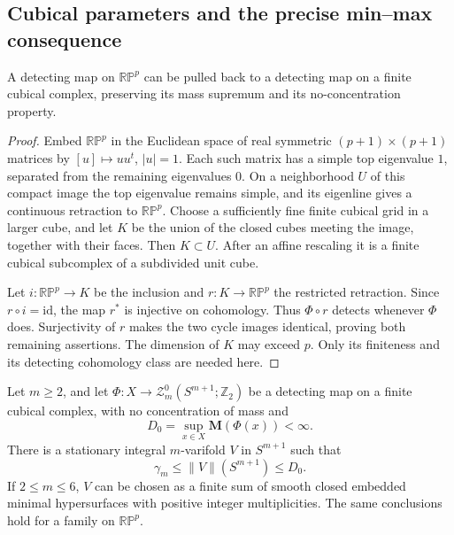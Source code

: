 \subsection{Cubical parameters and the precise min--max consequence}

\begin{lemma}\label{lem:minmax-cubical}
A detecting map on $\mathbb{RP}^{p}$ can be pulled back to a
detecting map on a finite cubical complex, preserving its mass
supremum and its no-concentration property.
\end{lemma}

\begin{proof}
Embed $\mathbb{RP}^{p}$ in the Euclidean space of real symmetric
$(p+1)\times(p+1)$ matrices by $[u]\mapsto uu^t$, $|u|=1$.
Each such matrix has a simple top eigenvalue $1$, separated from
the remaining eigenvalues $0$. On a neighborhood $U$ of this
compact image the top eigenvalue remains simple, and its eigenline
gives a continuous retraction to $\mathbb{RP}^{p}$. Choose a
sufficiently fine finite cubical grid in a larger cube, and let $K$
be the union of the closed cubes meeting the image, together with
their faces. Then $K\subset U$. After an affine rescaling it is a
finite cubical subcomplex of a subdivided unit cube.

Let $i:\mathbb{RP}^{p}\to K$ be the inclusion and
$r:K\to\mathbb{RP}^{p}$ the restricted retraction. Since
$r\circ i=\mathrm{id}$, the map $r^*$ is injective on cohomology.
Thus $\Phi\circ r$ detects whenever $\Phi$ does. Surjectivity of
$r$ makes the two cycle images identical, proving both remaining
assertions. The dimension of $K$ may exceed $p$. Only its finiteness
and its detecting cohomology class are needed here.
\end{proof}

\begin{theorem}\label{thm:minmax}
Let $m\ge2$, and let
$\Phi:X\to\mathcal Z_m^0(S^{m+1};\mathbb Z_2)$ be a detecting
map on a finite cubical complex, with no concentration of mass and
\[
 D_0=\sup_{x\in X}\mathbf M(\Phi(x))<\infty.
\]
There is a stationary integral $m$-varifold $V$ in $S^{m+1}$ such
that
\begin{equation}\label{eq:minmax-output}
 \gamma_m\le\|V\|(S^{m+1})\le D_0.
\end{equation}
If $2\le m\le6$, $V$ can be chosen as a finite sum of smooth
closed embedded minimal hypersurfaces with positive integer
multiplicities. The same conclusions hold for a family on
$\mathbb{RP}^{p}$.
\end{theorem}

